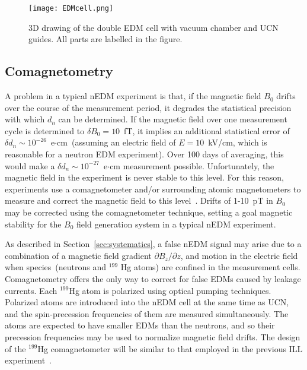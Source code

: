 \begin{figure}[h!]
  \centering
  \texttt{[image: EDMcell.png]}
  \caption[3D drawing of TUCAN's double EDM cell]{3D drawing of the
    double EDM cell with vacuum chamber and UCN guides. All parts are
    labelled in the figure.}
  \label{fig:HVcell}
\end{figure}



\subsection{Comagnetometry}
A problem in a typical nEDM experiment is that, if the magnetic field
$B_0$ drifts over the course of the measurement period, it degrades
the statistical precision with which $d_n$ can be determined.  If the
magnetic field over one measurement cycle is determined to
$\delta B_0=10$~fT, it implies an additional statistical error of
$\delta d_n\sim 10^{-26}$~e$\cdot$cm~(assuming an electric field of
$E=10$~kV/cm, which is reasonable for a neutron EDM experiment). Over
100 days of averaging, this would make a
$\delta d_n\sim 10^{-27}$~e$\cdot$cm measurement possible.
Unfortunately, the magnetic field in the experiment is never stable to
this level.  For this reason, experiments use a comagnetometer and/or
surrounding atomic magnetometers to measure and correct the magnetic
field to this
level~\cite{Baker2006,brys2005magnetic,afach2014dynamic}. Drifts of
1-10~pT in $B_0$ may be corrected using the comagnetometer technique,
setting a goal magnetic stability for the $B_0$ field generation
system in a typical nEDM experiment.



As described in Section~\ref{sec:systematics}, a false nEDM signal may
arise due to a combination of a magnetic field gradient
$\partial {B_z}/\partial z$, and motion in the electric field when
species~(neutrons and $^{199}$ Hg atoms) are confined in the
measurement cells. Comagnetometry offers the only way to correct for
false EDMs caused by leakage currents.  Each $^{199}$Hg atom is
polarized using optical pumping techniques. Polarized atoms are
introduced into the nEDM cell at the same time as UCN, and the
spin-precession frequencies of them are measured simultaneously. The
atoms are expected to have smaller EDMs than the neutrons, and so
their precession frequencies may be used to normalize magnetic field
drifts.  The design of the $^{199}$Hg comagnetometer will be similar
to that employed in the previous ILL
experiment~\cite{Baker2006,Griffith2009}.

